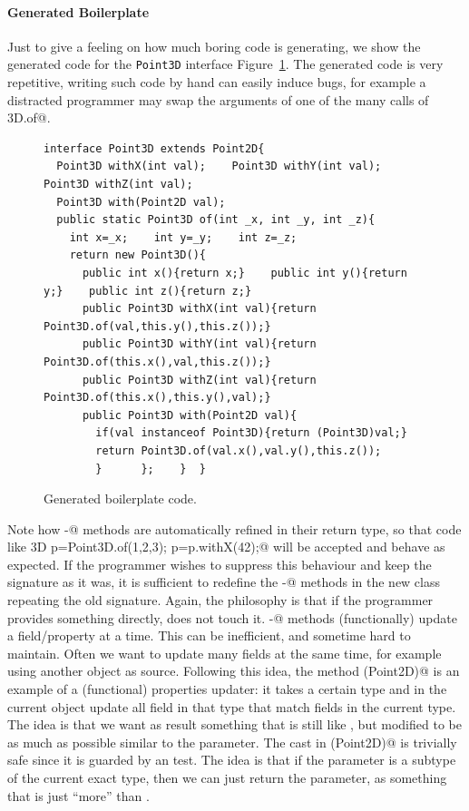 \paragraph{Generated Boilerplate}
Just to give a feeling on how much boring code \mixin is generating,
we show the generated code for the \texttt{Point3D} interface 
Figure~\ref{fig:boilerplate}. The generated code is very repetitive,
writing such code by hand can easily induce bugs, for example a
distracted programmer may swap the arguments of one of the many calls of
\Q@Point3D.of@.
\begin{figure}
\begin{lstlisting}
interface Point3D extends Point2D{
  Point3D withX(int val);    Point3D withY(int val);    Point3D withZ(int val);
  Point3D with(Point2D val);
  public static Point3D of(int _x, int _y, int _z){
    int x=_x;    int y=_y;    int z=_z;
    return new Point3D(){
      public int x(){return x;}    public int y(){return y;}    public int z(){return z;}
      public Point3D withX(int val){return Point3D.of(val,this.y(),this.z());}
      public Point3D withY(int val){return Point3D.of(this.x(),val,this.z());}
      public Point3D withZ(int val){return Point3D.of(this.x(),this.y(),val);}
      public Point3D with(Point2D val){
        if(val instanceof Point3D){return (Point3D)val;}
        return Point3D.of(val.x(),val.y(),this.z());
        }      };    }  }
\end{lstlisting}
\caption{Generated boilerplate code.}
\label{fig:boilerplate}
\end{figure}
Note how \Q@with-@ methods are automatically refined in their return type, so that code like 
\Q@Point3D p=Point3D.of(1,2,3); p=p.withX(42);@ will be accepted and behave as expected. If the programmer wishes to suppress this behaviour and keep the signature as it was, it is sufficient to redefine the \Q@with-@ methods in the new class repeating the old signature.
Again, the philosophy is that if the programmer provides something directly, \mixin does not touch it.
\Q@with-@ methods (functionally) update a field/property at a time.
This can be inefficient, and sometime hard to maintain.
Often we want to update many fields at the same time, for example using another object as source.
Following this idea, the method \Q@with(Point2D)@ is an example of a (functional) properties updater: 
it takes a certain type and in the current object update all field in that type that match fields in the current type.
The idea is that we want as result something that is still like \Q@this@, but modified to be as much as possible similar to the parameter.
The cast in \Q@with(Point2D)@ is trivially safe since it is guarded by an \Q@instanceof@ test. The idea is that if the parameter is a subtype of the current exact type, then we can just return the parameter, as something that is just ``more'' than \Q@this@.

